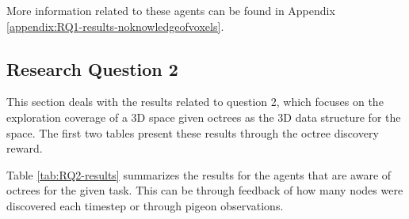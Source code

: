 More information related to these agents can be found in Appendix \ref{appendix:RQ1-results-noknowledgeofvoxels}.







\subsection{Research Question 2}\label{chap:4:results-RQ2}

This section deals with the results related to question 2, which focuses on the exploration coverage of a 3D space given octrees as the 3D data structure for the space. 
The first two tables present these results through the octree discovery reward.

Table \ref{tab:RQ2-results} summarizes the results for the agents that are aware of octrees for the given task. This can be through feedback of how many nodes were discovered each timestep or through pigeon observations. 

